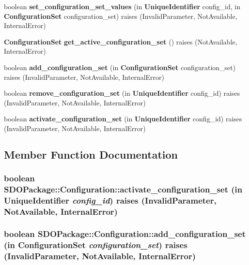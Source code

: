 \begin{CompactItemize}
\item 
boolean {\bf set\_\-configuration\_\-set\_\-values} (in {\bf Unique\-Identifier} config\_\-id, in {\bf Configuration\-Set} configuration\_\-set)  raises (Invalid\-Parameter, Not\-Available, Internal\-Error)
\item 
{\bf Configuration\-Set} {\bf get\_\-active\_\-configuration\_\-set} ()  raises (Not\-Available, Internal\-Error)
\item 
boolean {\bf add\_\-configuration\_\-set} (in {\bf Configuration\-Set} configuration\_\-set)  raises (Invalid\-Parameter, Not\-Available, Internal\-Error)
\item 
boolean {\bf remove\_\-configuration\_\-set} (in {\bf Unique\-Identifier} config\_\-id)  raises (Invalid\-Parameter, Not\-Available, Internal\-Error)
\item 
boolean {\bf activate\_\-configuration\_\-set} (in {\bf Unique\-Identifier} config\_\-id)  raises (Invalid\-Parameter, Not\-Available, Internal\-Error)
\end{CompactItemize}


\subsection{Member Function Documentation}
\subsubsection{\setlength{\rightskip}{0pt plus 5cm}boolean SDOPackage::Configuration::activate\_\-configuration\_\-set (in {\bf Unique\-Identifier} {\em config\_\-id})  raises (Invalid\-Parameter, Not\-Available, Internal\-Error)}\label{interfaceSDOPackage_1_1Configuration_SDOPackage_1_1Configurationa15}


\subsubsection{\setlength{\rightskip}{0pt plus 5cm}boolean SDOPackage::Configuration::add\_\-configuration\_\-set (in {\bf Configuration\-Set} {\em configuration\_\-set})  raises (Invalid\-Parameter, Not\-Available, Internal\-Error)}\label{interfaceSDOPackage_1_1Configuration_SDOPackage_1_1Configurationa13}


